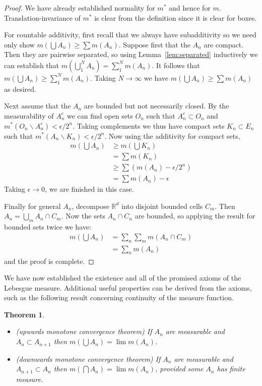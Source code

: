 \documentclass[11pt,oneside]{amsbook}
\renewcommand{\setminus}{\smallsetminus}
\newcommand{\RR}{{\mathbb R}}
\theoremstyle{definition}
\theoremstyle{plain}
\newtheorem{thm}{Theorem}[section]
\theoremstyle{definition}
\theoremstyle{remark}
\numberwithin{equation}{section}
\numberwithin{figure}{section}
\begin{document}
\begin{proof}
  We have already established normality for $m^*$ and hence for $m$. Translation-invariance of $m^*$ is clear from the definition since it is clear for boxes.

  For countable additivity, first recall that we always have subadditivity so we need only show $m(\bigcup A_n)\geq\sum m(A_n)$. Suppose first that the $A_n$ are compact. Then they are pairwise separated, so using Lemma~\ref{lem:separated} inductively we can establish that $m(\bigcup_1^N A_n)=\sum_1^N m(A_n)$. It follows that $m(\bigcup A_n)\geq\sum_1^Nm(A_n)$. Taking $N\to\infty$ we have $m(\bigcup A_n)\geq\sum m(A_n)$ as desired.

  Next assume that the $A_n$ are bounded but not necessarily closed. By the measurability of $A_n^c$ we can find open sets $O_n$ such that $A_n^c\subset O_n$ and $m^*(O_n\setminus A_n^c)<\epsilon/2^n$. Taking complements we thus have compact sets $K_n\subset E_n$ such that $m^*(A_n\setminus K_n)<\epsilon/2^n$. Now using the additivity for compact sets,
  \begin{align*}
    m(\bigcup A_n)&\geq m(\bigcup K_n)\\
                  &=\sum m(K_n)\\
                  &\geq\sum(m(A_n)-\epsilon/2^n)\\
                  &=\sum m(A_n)-\epsilon
  \end{align*}
  Taking $\epsilon\to0$, we are finished in this case.

  Finally for general $A_n$, decompose $\RR^d$ into disjoint bounded cells $C_m$. Then $A_n=\bigcup_m A_n\cap C_m$. Now the sets $A_n\cap C_n$ are bounded, so applying the result for bounded sets twice we have:
  \begin{align*}
    m(\bigcup A_n)&=\sum_n\sum_m m(A_n\cap C_m)\\
                  &=\sum_n m(A_n)
  \end{align*}
  and the proof is complete.
\end{proof}

We have now established the existence and all of the promised axioms of the Lebesgue measure. Additional useful properties can be derived from the axioms, such as the following result concerning continuity of the measure function.

\begin{thm}
  \label{thm:mct}
  \begin{itemize}
  \item (upwards monotone convergence theorem) If $A_n$ are measurable and $A_n\subset A_{n+1}$ then $m(\bigcup A_n)=\lim m(A_n)$.
  \item (downwards monotone convergence theorem) If $A_n$ are measurable and $A_{n+1}\subset A_n$ then $m(\bigcap A_n)=\lim m(A_n)$, provided some $A_n$ has finite measure.
  \end{itemize}
\end{thm}
\end{document}
